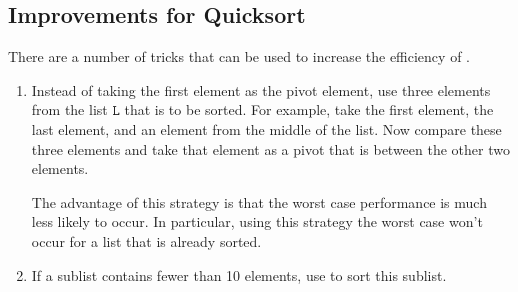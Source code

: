 \subsection{Improvements for Quicksort}
There are a number of tricks that can be used to increase the efficiency of .
\begin{enumerate}
\item Instead of taking the first element as the pivot element, use three elements from the list
      $\mathtt{L}$ that is to be sorted.  For example, take the first element, the last element, and an
      element from the middle of the list.  Now compare these three elements and take that element as
      a pivot that is between the other two elements.

      The advantage of this strategy is that the worst case performance is much less likely to occur.  In
      particular,  using this strategy the worst case won't occur for a list that is already
      sorted.
\item If a sublist contains fewer than 10 elements, use  to sort this sublist.


\end{enumerate}
